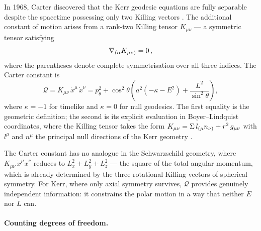 In 1968, Carter discovered that the Kerr geodesic equations are fully
separable despite the spacetime possessing only two Killing vectors
\cite{Carter1968}.  The additional constant of motion arises from a
rank-two Killing tensor $K_{\mu\nu}$ --- a symmetric tensor satisfying
%
\begin{equation}
  \nabla_{(\alpha} K_{\mu\nu)} = 0 \,,
  \label{eq:killing-tensor}
\end{equation}
%
where the parentheses denote complete symmetrisation over all three indices.
The Carter constant is
%
\begin{equation}
  \mathcal{Q} = K_{\mu\nu}\,\dot{x}^\mu\,\dot{x}^\nu
    = p_\theta^2 + \cos^2\!\theta
      \left(a^2(-\kappa - E^2) + \frac{L^2}{\sin^2\!\theta}\right) ,
  \label{eq:carter-constant}
\end{equation}
%
where $\kappa = -1$ for timelike and $\kappa = 0$ for null geodesics.  The
first equality is the geometric definition; the second is its explicit
evaluation in Boyer--Lindquist coordinates, where the Killing tensor takes
the form
$K_{\mu\nu} = \Sigma\,l_{(\mu}n_{\nu)} + r^2\,g_{\mu\nu}$ with $l^\mu$ and
$n^\mu$ the principal null directions of the Kerr geometry
\cite{Chandrasekhar1983}.

The Carter constant has no analogue in the Schwarzschild geometry, where
$K_{\mu\nu}\,\dot{x}^\mu\dot{x}^\nu$ reduces to
$L_x^2 + L_y^2 + L_z^2$ --- the square of the total angular momentum, which is already determined by the three rotational
Killing vectors of spherical symmetry.  For Kerr, where only axial symmetry
survives, $\mathcal{Q}$ provides genuinely independent information: it
constrains the polar motion in a way that neither $E$ nor $L$ can.

\paragraph{Counting degrees of freedom.}

